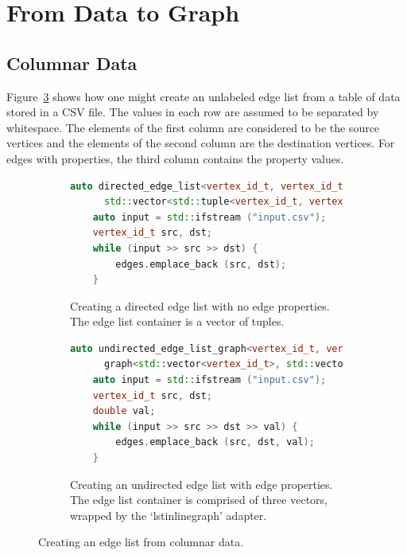 


\section{From Data to Graph}

\subsection{Columnar Data}

Figure~\ref{fig:edge_list_from_columnar_data}
shows how one might create an unlabeled edge list from a table of data stored in a CSV file.
The values in each row are assumed to be separated by whitespace.
The elements of the first column are considered to be the source vertices and the elements of
the second column are the destination vertices. For edges with properties, the third column
contains the property values.

\begin{figure}[ht]
  \begin{center}
    \begin{subfigure}{0.48\textwidth}
      \begin{lstlisting}[language=C++]
    auto directed_edge_list<vertex_id_t, vertex_id_t>
      std::vector<std::tuple<vertex_id_t, vertex_id_t> edges;
    auto input = std::ifstream ("input.csv");
    vertex_id_t src, dst;
    while (input >> src >> dst) {
        edges.emplace_back (src, dst);
    }
      \end{lstlisting}
      \caption{Creating a directed edge list with no edge properties.
      The edge list container is a vector of tuples.
      \label{subfig:edge_list_no_properties}}
    \end{subfigure}
    \begin{subfigure}{0.48\textwidth}
      \begin{lstlisting}[language=C++]
    auto undirected_edge_list_graph<vertex_id_t, vertex_id_t, double>
      graph<std::vector<vertex_id_t>, std::vector<vertex_id_t>, std::vector<double>> edges;
    auto input = std::ifstream ("input.csv");
    vertex_id_t src, dst;
    double val;
    while (input >> src >> dst >> val) {
        edges.emplace_back (src, dst, val);
    }
      \end{lstlisting}
      \caption{Creating an undirected edge list with edge properties.
      The edge list container is comprised of three vectors, wrapped by
      the `lstinline{graph}' adapter.
      \label{subfig:edge_list_with_properties}}
    \end{subfigure}
    \caption{Creating an edge list from columnar data.\label{fig:edge_list_from_columnar_data}}
  \end{center}
\end{figure}

